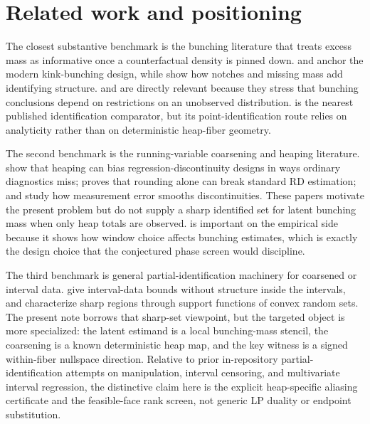 \documentclass[11pt]{article}
\theoremstyle{definition}
\theoremstyle{plain}
\theoremstyle{remark}
\begin{document}
\section{Related work and positioning}
The closest substantive benchmark is the bunching literature that treats excess mass as informative once a counterfactual density is pinned down.  \cite{Saez2010Bunching} and \cite{ChettyFriedmanOlsenPistaferri2011Adjustment} anchor the modern kink-bunching design, while \cite{KlevenWaseem2013Notches} show how notches and missing mass add identifying structure.  \cite{BertanhaMcCallumSeegert2021BetterBunching} and \cite{BertanhaMcCallumPayneSeegert2022Stata} are directly relevant because they stress that bunching conclusions depend on restrictions on an unobserved distribution.  \cite{Song2024GeneralBunching} is the nearest published identification comparator, but its point-identification route relies on analyticity rather than on deterministic heap-fiber geometry.

The second benchmark is the running-variable coarsening and heaping literature.  \cite{BarrecaLindoWaddell2016HeapingRD} show that heaping can bias regression-discontinuity designs in ways ordinary diagnostics miss; \cite{Dong2015RoundingRD} proves that rounding alone can break standard RD estimation; and \cite{DaveziesLeBarbanchon2017RDMeasurementError} study how measurement error smooths discontinuities.  These papers motivate the present problem but do not supply a sharp identified set for latent bunching mass when only heap totals are observed.  \cite{BoschDekkerStrohmaier2020Window} is important on the empirical side because it shows how window choice affects bunching estimates, which is exactly the design choice that the conjectured phase screen would discipline.

The third benchmark is general partial-identification machinery for coarsened or interval data.  \cite{ManskiTamer2002IntervalData} give interval-data bounds without structure inside the intervals, and \cite{BeresteanuMolchanovMolinari2011ConvexMoment} characterize sharp regions through support functions of convex random sets.  The present note borrows that sharp-set viewpoint, but the targeted object is more specialized: the latent estimand is a local bunching-mass stencil, the coarsening is a known deterministic heap map, and the key witness is a signed within-fiber nullspace direction.  Relative to prior in-repository partial-identification attempts on manipulation, interval censoring, and multivariate interval regression, the distinctive claim here is the explicit heap-specific aliasing certificate and the feasible-face rank screen, not generic LP duality or endpoint substitution.
\end{document}
